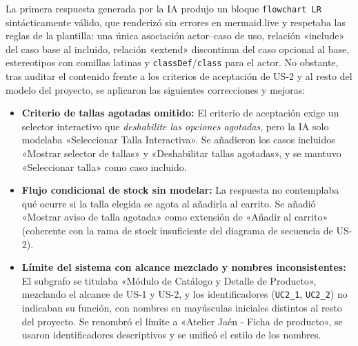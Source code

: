 La primera respuesta generada por la IA produjo un bloque \texttt{flowchart LR} sintácticamente válido, que renderizó sin errores en mermaid.live y respetaba las reglas de la plantilla: una única asociación actor--caso de uso, relación «include» del caso base al incluido, relación «extend» discontinua del caso opcional al base, estereotipos con comillas latinas y \texttt{classDef}/\texttt{class} para el actor. No obstante, tras auditar el contenido frente a los criterios de aceptación de US-2 y al resto del modelo del proyecto, se aplicaron las siguientes correcciones y mejoras:
\begin{itemize}[leftmargin=*,nosep]
\item \textbf{Criterio de tallas agotadas omitido:} El criterio de aceptación exige un selector interactivo que \emph{deshabilite las opciones agotadas}, pero la IA solo modelaba «Seleccionar Talla Interactiva». Se añadieron los casos incluidos «Mostrar selector de tallas» y «Deshabilitar tallas agotadas», y se mantuvo «Seleccionar talla» como caso incluido.
\item \textbf{Flujo condicional de stock sin modelar:} La respuesta no contemplaba qué ocurre si la talla elegida se agota al añadirla al carrito. Se añadió «Mostrar aviso de talla agotada» como extensión de «Añadir al carrito» (coherente con la rama de stock insuficiente del diagrama de secuencia de US-2).
\item \textbf{Límite del sistema con alcance mezclado y nombres inconsistentes:} El subgrafo se titulaba «Módulo de Catálogo y Detalle de Producto», mezclando el alcance de US-1 y US-2, y los identificadores (\texttt{UC2\_1}, \texttt{UC2\_2}) no indicaban su función, con nombres en mayúsculas iniciales distintos al resto del proyecto. Se renombró el límite a «Atelier Jaén - Ficha de producto», se usaron identificadores descriptivos y se unificó el estilo de los nombres.
\end{itemize}
